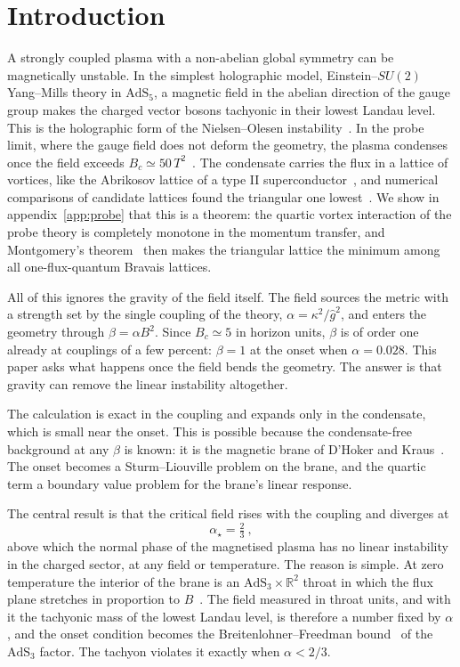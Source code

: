 \section{Introduction}
\label{sec:1}

A strongly coupled plasma with a non-abelian global symmetry can be
magnetically unstable. In the simplest holographic model, Einstein--$SU(2)$
Yang--Mills theory in $\mathrm{AdS}_5$, a magnetic field in the abelian
direction of the gauge group makes the charged vector bosons tachyonic in
their lowest Landau level. This is the holographic form of the
Nielsen--Olesen instability~\cite{Nielsen:1978rm}. In the probe limit, where
the gauge field does not deform the geometry, the plasma condenses once the
field exceeds $B_c \simeq 50\,T^2$~\cite{Ammon:2011je}. The condensate
carries the flux in a lattice of vortices, like the Abrikosov lattice of a
type II superconductor~\cite{Abrikosov:1956sx,Kleiner:1964zz}, and numerical
comparisons of candidate lattices found the triangular one
lowest~\cite{Bu:2012mq}. We show in appendix~\ref{app:probe} that this is a
theorem: the quartic vortex interaction of the probe theory is completely
monotone in the momentum transfer, and Montgomery's
theorem~\cite{Montgomery:1988mt,Cohn:2007universally,Betermin:2016theta}
then makes the triangular lattice the minimum among all one-flux-quantum
Bravais lattices.

All of this ignores the gravity of the field itself. The field sources the
metric with a strength set by the single coupling of the theory,
$\alpha = \kappa^2/\hat g^2$, and enters the geometry through
$\beta = \alpha B^2$. Since $B_c \simeq 5$ in horizon units, $\beta$ is of
order one already at couplings of a few percent: $\beta = 1$ at the onset
when $\alpha = 0.028$. This paper asks what happens once the field bends
the geometry. The answer is that gravity can remove the linear instability
altogether.

The calculation is exact in the coupling and expands only in the
condensate, which is small near the onset. This is possible because the
condensate-free background at any $\beta$ is known: it is the magnetic
brane of D'Hoker and Kraus~\cite{DHoker:2009mmn,DHoker:2009ixq}. The onset
becomes a Sturm--Liouville problem on the brane, and the quartic term a
boundary value problem for the brane's linear response.

The central result is that the critical field rises with the coupling and
diverges at
\begin{equation}
\alpha_\star = \tfrac23~,
\end{equation}
above which the normal phase of the magnetised plasma has no linear
instability in the charged sector, at any field or temperature. The reason
is simple. At zero temperature the interior of the brane is an
$\mathrm{AdS}_3 \times \mathbb{R}^2$ throat in which the flux plane
stretches in proportion to $B$~\cite{DHoker:2009mmn}. The field measured
in throat units, and with it the tachyonic mass of the lowest Landau level,
is therefore a number fixed by $\alpha$, and the onset condition becomes
the Breitenlohner--Freedman
bound~\cite{Breitenlohner:1982bm,Breitenlohner:1982jf} of the
$\mathrm{AdS}_3$ factor. The
tachyon violates it exactly when $\alpha < 2/3$.

